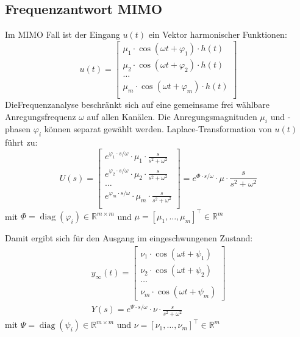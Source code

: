 \subsection{Frequenzantwort MIMO}
    Im MIMO Fall ist der Eingang $u(t)$ ein Vektor harmonischer Funktionen:
    \begin{equation*}
        u(t)=
        \begin{bmatrix}
        \mu_1\cdot\cos\left(\omega t + \varphi_1\right)\cdot h(t)\\
        \mu_2\cdot\cos\left(\omega t + \varphi_2\right)\cdot h(t)\\
        \dots\\
        \mu_m\cdot\cos\left(\omega t + \varphi_m\right)\cdot h(t)\\
        \end{bmatrix}
    \end{equation*}
    DieFrequenzanalyse beschränkt sich auf eine gemeinsame frei wählbare Anregungsfrequenz $\omega$ auf allen Kanälen. Die Anregungsmagnituden $\mu_i$ und -phasen $\varphi_i$ können separat gewählt werden. Laplace-Transformation von $u(t)$ führt zu:
    \begin{equation*}
        U(s)=
        \begin{bmatrix}
        e^{\varphi_1\cdot s/\omega} \cdot \mu_1 \cdot \frac{s}{s^2+\omega^2}\\
        e^{\varphi_2\cdot s/\omega} \cdot \mu_2 \cdot \frac{s}{s^2+\omega^2}\\
        \dots\\
        e^{\varphi_m\cdot s/\omega} \cdot \mu_m \cdot \frac{s}{s^2+\omega^2}\\
        \end{bmatrix}
        = e^{\Phi\cdot s/\omega}\cdot \mu\cdot\frac{s}{s^2+\omega^2}
    \end{equation*}
    mit $\Phi = \operatorname{diag}(\varphi_i)\in\mathbb{R}^{m\times m}$ und $\mu = [\mu_1,\dots,\mu_m]^\top \in\mathbb{R}^m$
    
    Damit ergibt sich für den Ausgang im eingeschwungenen Zustand:
    \begin{gather*}
        y_\infty(t) = 
        \begin{bmatrix}
            \nu_1\cdot\cos\left(\omega t +\psi_1\right)\\
            \nu_2\cdot\cos\left(\omega t +\psi_2\right)\\
            \dots\\
            \nu_m\cdot\cos\left(\omega t +\psi_m\right)
        \end{bmatrix}\\
        Y(s) = e^{\Psi\cdot s/\omega}\cdot\nu\cdot\frac{s}{s^2+\omega^2}
    \end{gather*}
     mit $\Psi = \operatorname{diag}(\psi_i)\in\mathbb{R}^{m\times m}$ und $\nu = [\nu_1,\dots,\nu_m]^\top \in\mathbb{R}^m$
     

